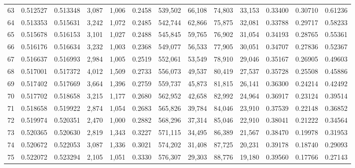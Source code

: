 \begin{tabular}{rrrrrrrrrrrrr}
63 &  0.512527 &  0.513348 &   3,087 &  1,006 &                                     0.2458 &  539,502 &   66,108 &   74,803 &   33,153 &  0.33400 &  0.30710 &  0.61236 \\
64 &  0.513353 &  0.515631 &   3,242 &  1,072 &                                     0.2485 &  542,744 &   62,866 &   75,875 &   32,081 &  0.33788 &  0.29717 &  0.58233 \\
65 &  0.515678 &  0.516153 &   3,101 &  1,027 &                                     0.2488 &  545,845 &   59,765 &   76,902 &   31,054 &  0.34193 &  0.28765 &  0.55361 \\
66 &  0.516176 &  0.516634 &   3,232 &  1,003 &                                     0.2368 &  549,077 &   56,533 &   77,905 &   30,051 &  0.34707 &  0.27836 &  0.52367 \\
67 &  0.516637 &  0.516993 &   2,984 &  1,005 &                                     0.2519 &  552,061 &   53,549 &   78,910 &   29,046 &  0.35167 &  0.26905 &  0.49603 \\
68 &  0.517001 &  0.517372 &   4,012 &  1,509 &                                     0.2733 &  556,073 &   49,537 &   80,419 &   27,537 &  0.35728 &  0.25508 &  0.45886 \\
69 &  0.517402 &  0.517669 &   3,664 &  1,396 &                                     0.2759 &  559,737 &   45,873 &   81,815 &   26,141 &  0.36300 &  0.24214 &  0.42492 \\
70 &  0.517702 &  0.518658 &   3,215 &  1,177 &                                     0.2680 &  562,952 &   42,658 &   82,992 &   24,964 &  0.36917 &  0.23124 &  0.39514 \\
71 &  0.518658 &  0.519922 &   2,874 &  1,054 &                                     0.2683 &  565,826 &   39,784 &   84,046 &   23,910 &  0.37539 &  0.22148 &  0.36852 \\
72 &  0.519974 &  0.520351 &   2,470 &  1,000 &                                     0.2882 &  568,296 &   37,314 &   85,046 &   22,910 &  0.38041 &  0.21222 &  0.34564 \\
73 &  0.520365 &  0.520630 &   2,819 &  1,343 &                                     0.3227 &  571,115 &   34,495 &   86,389 &   21,567 &  0.38470 &  0.19978 &  0.31953 \\
74 &  0.520672 &  0.522053 &   3,087 &  1,336 &                                     0.3021 &  574,202 &   31,408 &   87,725 &   20,231 &  0.39178 &  0.18740 &  0.29093 \\
75 &  0.522072 &  0.523294 &   2,105 &  1,051 &                                     0.3330 &  576,307 &   29,303 &   88,776 &   19,180 &  0.39560 &  0.17766 &  0.27143 \\

\end{tabular}
